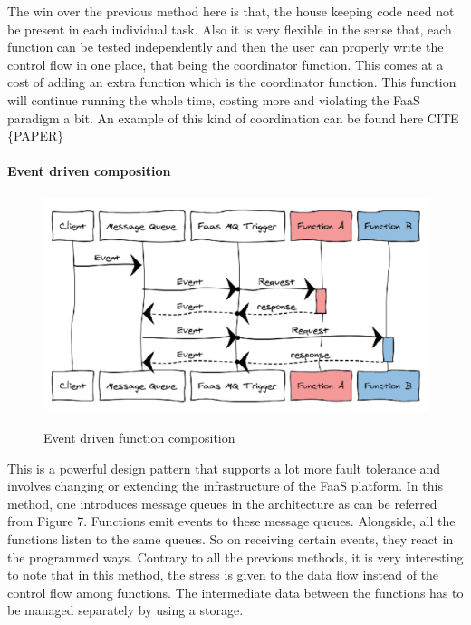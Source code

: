 \documentclass[12pt,titlepage]{article}
\begin{document}
The win over the previous method here is that, the house keeping code need not
be present in each individual task. Also it is very flexible in the sense that,
each function can be tested independently and then the user can properly write
the control flow in one place, that being the coordinator function. This comes
at a cost of adding an extra function which is the coordinator function. This
function will continue running the whole time, costing more and violating the
FaaS paradigm a bit. An example of this kind of coordination can be found here
CITE \{\href{https://www.researchgate.net/publication/331572138\_A\_framework\_and\_a\_performance\_assessment\_for\_serverless\_MapReduce\_on\_AWS\_Lambda}{PAPER}\}

\paragraph{Event driven composition}
\label{sec:org077f8d7}

\begin{figure}
\caption{Event driven function composition}
\centering
\includegraphics[width=150mm]{./thesis_images/event.png}
\label{fig:Event}
\end{figure}

This is a powerful design pattern that supports a lot more fault tolerance and
involves changing or extending the infrastructure of the FaaS platform. In this
method, one introduces message queues in the architecture as can be referred
from Figure 7. Functions emit events to these message queues. Alongside, all the
functions listen to the same queues. So on receiving certain events, they react
in the programmed ways. Contrary to all the previous methods, it is very
interesting to note that in this method, the stress is given to the data flow
instead of the control flow among functions. The intermediate data between the
functions has to be managed separately by using a storage.
\end{document}
